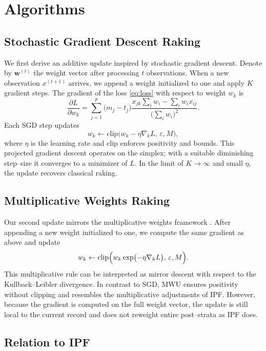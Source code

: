 \documentclass[12pt, letterpaper]{article}
\begin{document}
\section{Algorithms}
\label{sec:algorithms}

\subsection{Stochastic Gradient Descent Raking}

We first derive an additive update inspired by stochastic gradient
descent.  Denote by \(\mathbf{w}^{(t)}\) the weight vector after
processing \(t\) observations.  When a new observation \(x^{(t+1)}\)
arrives, we append a weight initialized to one and apply
\(K\) gradient steps.  The gradient of the loss \eqref{eq:loss} with
respect to weight \(w_k\) is
\[
  \frac{\partial L}{\partial w_k} = \sum_{j=1}^p
  \bigl(m_j - t_j\bigr)
  \frac{x_{jk} \sum_i w_i - \sum_i w_i x_{ij}}{\bigl(\sum_i w_i\bigr)^2}.
\]
Each SGD step updates
\[
  w_k \leftarrow \mathrm{clip}\bigl(w_k - \eta \nabla_k L,\,
  \varepsilon, M\bigr),
\]
where \(\eta\) is the learning rate and \(\mathrm{clip}\) enforces
positivity and bounds.  This projected gradient descent operates on
the simplex; with a suitable diminishing step--size it converges to a
minimizer of \(L\).  In the limit of \(K\to\infty\) and small
\(\eta\), the update recovers classical raking.

\subsection{Multiplicative Weights Raking}

Our second update mirrors the multiplicative weights framework
\citep{Arora2012}.  After appending a new weight initialized to one, we
compute the same gradient as above and update
\[
  w_k \leftarrow \mathrm{clip}\Bigl(w_k \exp\bigl(-\eta \nabla_k L\bigr),\,
  \varepsilon, M\Bigr).
\]
This multiplicative rule can be interpreted as mirror descent with
respect to the Kullback–Leibler divergence.  In contrast to SGD, MWU
ensures positivity without clipping and resembles the multiplicative
adjustments of IPF.  However, because the gradient is computed on the
full weight vector, the update is still local to the current record and
does not reweight entire post–strata as IPF does.

\subsection{Relation to IPF}
\end{document}
